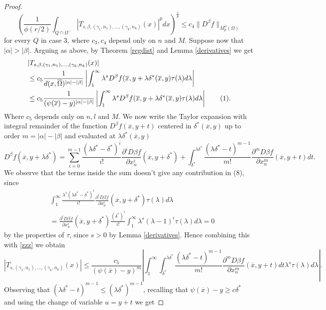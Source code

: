 \documentclass[12pt]{article}
\theoremstyle{definition}
\newcommand\addtag{\refstepcounter{equation}\tag{\theequation}}
\begin{document}
\begin{proof}
\[\left( \frac{1}{\phi(r/2)}\int_{Q \cap \Omega^-}  \left| T_{s,\beta,(\gamma_1,n_1),...,(\gamma_k,n_k)}(x)\right|^p dx\right )^{\frac{1}{p}} \le c_4 \| D^\beta f \|_{M_p^\phi(\Omega)} \] 
 for every $Q$ in case 3, where $c_3,c_4$ depend only on $n$ and $M.$
Suppose now that $|\alpha|>|\beta|.$ Arguing as above, by Theorem \ref{regdist} and Lemma \ref{derivatives} we get
\begin{align*}
&|T_{s,\beta,(\gamma_1,n_1),...,(\gamma_k,n_k)}(x) | \\
&\le c_5 \frac{1}{d(x,\overline \Omega)^{|\alpha|-|\beta|}} \left|\int_1^\infty \lambda^sD^\beta f(\overline x, y+\lambda \delta^*(\overline x, y)\tau(\lambda)d\lambda \right| \\
& \le  c_5 \frac{1}{(\psi(\overline x)-y)^{|\alpha|-|\beta|}} \left |\int_1^\infty \lambda^s D^\beta f(\overline x, y+\lambda \delta^*(\overline x, y) \tau(\lambda)d\lambda \right |\addtag \label{zzz} .   
\end{align*}
Where $c_5$ depends only on $n,l$ and $M$. We now write the Taylor expansion with integral remainder of the function $D^\beta f(\overline x, y+t)$ centered in $\delta^*(\overline x,y)$ up to order $m=|\alpha|-|\beta|$ and evaluated at $\lambda \delta^*(\overline x,y)$
\[
D^\beta f(\overline x, y+\lambda \delta^*) =\sum_{i=0}^{m-1} \frac{(\lambda \delta^*-\delta^*)^i}{i!}\frac{\partial^i D\beta f}{\partial x_n^i}(\overline x,y+\delta^*) +\int_{\delta^*}^{\lambda \delta^*} \frac{(\lambda \delta^*-t)^{m-1}}{m!}\frac{\partial^{m} D\beta f}{\partial x_n^{m} }(\overline x,y+t)dt. 
\]
We observe that the terms inside the sum doesn't give any contribution in (8), since
\begin{align*} &\int_1^\infty \frac{\lambda^s(\lambda \delta^*-\delta^*)^i}{i!}\frac{\partial^i D\beta f}{\partial x_n^i}(\overline x,y+\delta^*)\tau(\lambda)d\lambda \\
&=\frac{\partial^i D\beta f}{\partial x_n^i}(\overline x,y+\delta^*) \frac{(\delta^*)^i}{i!} \int_1^\infty \lambda^s(\lambda-1)^i\tau(\lambda)d\lambda=0
\end{align*}
by the properties of $\tau$, since $s>0$ by Lemma \ref{derivatives}. Hence combining this with \eqref{zzz} we obtain
\[|T_{s,(\gamma_1,n_1),...,(\gamma_k,n_k)}(x) | \le \frac{c_5}{(\psi(\overline x)-y)^{m}} \left |\int_1^\infty \int_{\delta^*}^{\lambda \delta^*} \frac{(\lambda \delta^*-t)^{m-1}}{m!}\frac{\partial^{m} D\beta f}{\partial x_n^{m} }(\overline x,y+t)dt \lambda^s \tau(\lambda)d\lambda\right |.\]
Observing that $(\lambda\delta^*-t)^{m-1}\le (\lambda\delta^*)^{m-1}$, recalling that $\psi(\overline x)-y\ge c \delta^*$ and using the change of variable $u=y+t$ we get

\end{proof}
\end{document}
